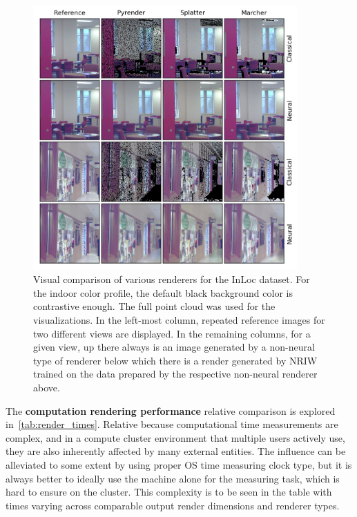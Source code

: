 \begin{figure}
    \centering
    \includegraphics[width=0.9\textwidth]{graphics/inloc-renderers.png}
    \caption[Visual comparison of various renderers for InLoc dataset]{Visual
    comparison of various renderers for the InLoc dataset.
    For the indoor color profile, the default black background color is contrastive
    enough. The full point cloud was used for the visualizations. In the left-most
    column, repeated reference images for two different views are displayed. In the
    remaining columns, for a given view, up there always is an image generated by
    a non-neural type of renderer below which there is a render generated by NRIW
    trained on the data prepared by the respective non-neural renderer above.}
    \label{fig:inloc_renderers}
\end{figure}

The \textbf{computation rendering performance} relative comparison is
explored in~\cref{tab:render_times}. Relative because computational time
measurements are complex, and in a compute cluster environment that multiple
users actively use, they are also inherently affected by many
external entities. The influence can be alleviated to some extent by using proper
OS time measuring clock type, but it is always better to ideally use the
machine alone for the measuring task, which is hard to ensure on the cluster.
This complexity is to be seen in the table with times varying across
comparable output render dimensions and renderer types.

